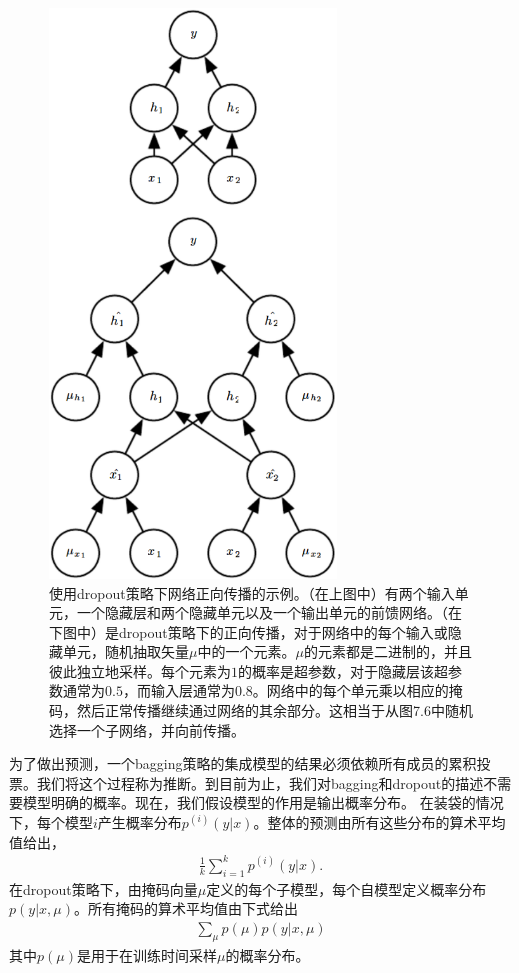 \begin{figure}[htbp] %
   \centering
   \includegraphics[width=3in]{fig/chap7/7_7.png} 
   \caption{使用dropout策略下网络正向传播的示例。（在上图中）有两个输入单元，一个隐藏层和两个隐藏单元以及一个输出单元的前馈网络。（在下图中）是dropout策略下的正向传播，对于网络中的每个输入或隐藏单元，随机抽取矢量$\mu$中的一个元素。$\mu$的元素都是二进制的，并且彼此独立地采样。每个元素为$1$的概率是超参数，对于隐藏层该超参数通常为$0.5$，而输入层通常为$0.8$。网络中的每个单元乘以相应的掩码，然后正常传播继续通过网络的其余部分。这相当于从图7.6中随机选择一个子网络，并向前传播。}
   \label{fig:7_7}
\end{figure}

为了做出预测，一个bagging策略的集成模型的结果必须依赖所有成员的累积投票。我们将这个过程称为推断。到目前为止，我们对bagging和dropout的描述不需要模型明确的概率。现在，我们假设模型的作用是输出概率分布。 在装袋的情况下，每个模型$i$产生概率分布$p^{(i)} (y|x)$。整体的预测由所有这些分布的算术平均值给出，
$$
\begin{aligned}
	\frac{1}{k} \sum_{i=1}^{k} p^{(i)} (y | x).
\end{aligned}
$$
在dropout策略下，由掩码向量$\mu$定义的每个子模型，每个自模型定义概率分布$p(y | x, \mu)$。所有掩码的算术平均值由下式给出
$$
\begin{aligned}
	\sum_{\mu} p(\mu) p(y|x,\mu)
\end{aligned}
$$
其中$p(\mu)$是用于在训练时间采样$\mu$的概率分布。

